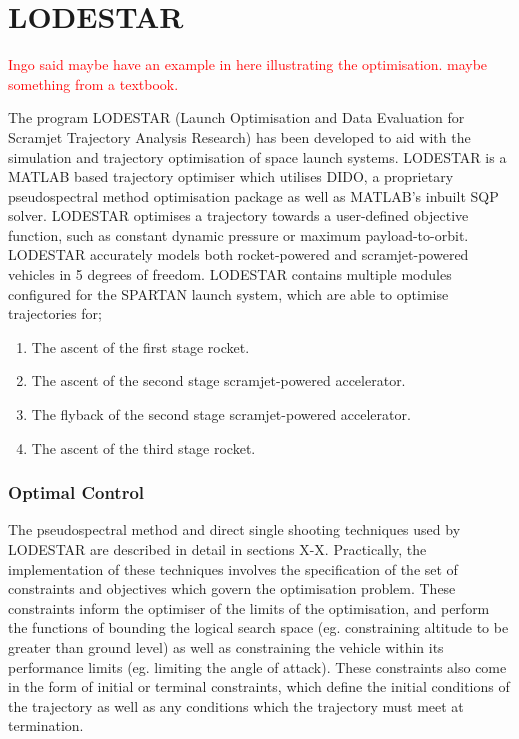 
\cleardoublepage
\chapter{LODESTAR}\label{chapter:experimental-results}

 \textcolor{red}{Ingo said maybe have an example in here illustrating the optimisation. maybe something from a textbook. }	

The program LODESTAR (Launch Optimisation and Data Evaluation for Scramjet Trajectory Analysis Research) has been developed to aid with the simulation and trajectory optimisation of space launch systems. LODESTAR is a MATLAB based trajectory optimiser which utilises DIDO, a proprietary pseudospectral method optimisation package as well as MATLAB's inbuilt SQP solver. LODESTAR optimises a trajectory towards a user-defined objective function, such as constant dynamic pressure or maximum payload-to-orbit.  LODESTAR accurately models both rocket-powered and scramjet-powered vehicles in 5 degrees of freedom. LODESTAR contains multiple modules configured for the SPARTAN launch system, which are able to optimise trajectories for;
\begin{enumerate}
 \item The ascent of the first stage rocket.
 \item The ascent of the second stage scramjet-powered accelerator.
 \item The flyback of the second stage scramjet-powered accelerator.
 \item The ascent of the third stage rocket.
\end{enumerate}

\subsection{Optimal Control}
The pseudospectral method and direct single shooting techniques used by LODESTAR are described in detail in sections X-X. Practically, the implementation of these techniques involves the specification of the set of constraints and objectives which govern the optimisation problem. These constraints inform the optimiser of the limits of the optimisation, and perform the functions of bounding the logical search space (eg. constraining altitude to be greater than ground level) as well as constraining the vehicle within its performance limits (eg. limiting the angle of attack). These constraints also come in the form of initial or terminal constraints, which define the initial conditions of the trajectory as well as any conditions which the trajectory must meet at termination. 

